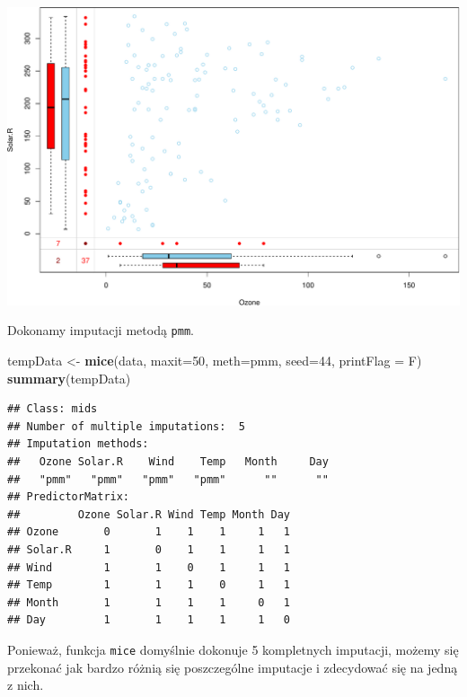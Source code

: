 \documentclass[
]{book}
\newenvironment{Shaded}{\begin{snugshade}}{\end{snugshade}}
\newcommand{\AttributeTok}[1]{\textcolor[rgb]{0.13,0.29,0.53}{#1}}
\newcommand{\DecValTok}[1]{\textcolor[rgb]{0.00,0.00,0.81}{#1}}
\newcommand{\FunctionTok}[1]{\textcolor[rgb]{0.13,0.29,0.53}{\textbf{#1}}}
\newcommand{\NormalTok}[1]{#1}
\newcommand{\OtherTok}[1]{\textcolor[rgb]{0.56,0.35,0.01}{#1}}
\newcommand{\StringTok}[1]{\textcolor[rgb]{0.31,0.60,0.02}{#1}}
\theoremstyle{plain}
\theoremstyle{definition}
\theoremstyle{definition}
\theoremstyle{definition}
\theoremstyle{definition}
\theoremstyle{definition}
\theoremstyle{remark}
\begin{document}
\includegraphics{EksploracjaDanych_files/figure-latex/unnamed-chunk-5-1.pdf}

Dokonamy imputacji metodą \texttt{pmm}.

\begin{Shaded}
\begin{Highlighting}[]
\NormalTok{tempData }\OtherTok{\textless{}{-}} \FunctionTok{mice}\NormalTok{(data, }
                 \AttributeTok{maxit=}\DecValTok{50}\NormalTok{, }
                 \AttributeTok{meth=}\StringTok{\textquotesingle{}pmm\textquotesingle{}}\NormalTok{, }
                 \AttributeTok{seed=}\DecValTok{44}\NormalTok{, }
                 \AttributeTok{printFlag =}\NormalTok{ F)}
\FunctionTok{summary}\NormalTok{(tempData)}
\end{Highlighting}
\end{Shaded}

\begin{verbatim}
## Class: mids
## Number of multiple imputations:  5 
## Imputation methods:
##   Ozone Solar.R    Wind    Temp   Month     Day 
##   "pmm"   "pmm"   "pmm"   "pmm"      ""      "" 
## PredictorMatrix:
##         Ozone Solar.R Wind Temp Month Day
## Ozone       0       1    1    1     1   1
## Solar.R     1       0    1    1     1   1
## Wind        1       1    0    1     1   1
## Temp        1       1    1    0     1   1
## Month       1       1    1    1     0   1
## Day         1       1    1    1     1   0
\end{verbatim}

Ponieważ, funkcja \texttt{mice} domyślnie dokonuje 5 kompletnych imputacji, możemy się przekonać jak bardzo różnią się poszczególne imputacje i zdecydować się na jedną z nich.
\end{document}
